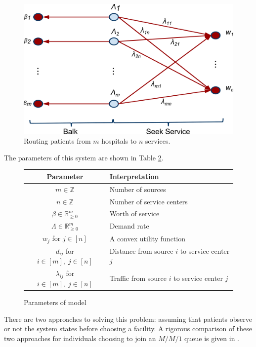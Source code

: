 \documentclass[a4paper,11pt]{article}
\begin{document}
\begin{figure}[!hbtp]
\begin{center}
\includegraphics[width=.7\textwidth]{./Images/Hospital_Choices.pdf}
\end{center}
\caption{Routing patients from $m$ hospitals to $n$ services.}\label{fig:choices}
\end{figure}

The parameters of this system are shown in Table \ref{tab:parameters}.

\begin{figure}[!hbtp]
\begin{center}
\begin{tabular}{cl}
\toprule
Parameter & Interpretation\\
\midrule
$m\in\mathbb{Z}$& Number of sources\\
$n\in\mathbb{Z}$& Number of service centers\\
$\beta\in\mathbb{R}_{\geq 0}^{m}$& Worth of service\\
$\Lambda\in\mathbb{R}_{\geq 0}^{m}$& Demand rate\\
$w_j$ for $j\in[n]$& A convex utility function\\
$d_{ij}$ for $i\in[m],\;j\in[n]$& Distance from source $i$ to service center $j$\\
$\lambda_{ij}$ for $i\in[m],\;j\in[n]$& Traffic from source $i$ to service center $j$\\
\toprule
\end{tabular}
\caption{Parameters of model}\label{tab:parameters}
\end{center}
\end{figure}

There are two approaches to solving this problem: assuming that patients observe or not the system states before choosing a facility.
A rigorous comparison of these two approaches for individuals choosing to join an $M/M/1$ queue is given in \cite{shone2013comparisons}.
\end{document}
